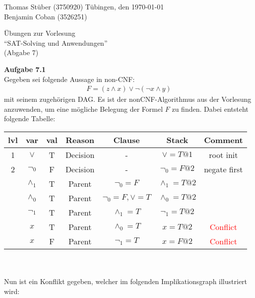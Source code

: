 \documentclass[a4paper,10pt]{article}
\title{}
\author{}
\begin{document}
\noindent Thomas Stüber (3750920) \hfill Tübingen, den  \today\\
\noindent Benjamin Coban (3526251) \\
\begin{center}
\Large Übungen zur Vorlesung  \\ ``SAT-Solving und Anwendungen'' \\
\vspace*{2mm}
\large (Abgabe 7) \\
\vspace*{2mm}
\end{center}

\noindent\textbf{Aufgabe 7.1}\\

Gegeben sei folgende Aussage in non-CNF:
\begin{align*}
F = (z \wedge x) \vee \neg(\neg x \wedge y)
\end{align*}
mit seinem zugehörigen DAG. Es ist der nonCNF-Algorithmus aus der Vorlesung anzuwenden, um eine mögliche Belegung der Formel $F$ zu finden. Dabei entsteht folgende Tabelle:\\
\begin{tabular}{|c|c|c|c|c|c|c|}
	\hline 
	lvl & var & val & Reason & Clause & Stack & Comment \\ 
	\hline 
	1 & $\vee$ & T & Decision & - & $\vee=T@1$ & root init \\ 
	\hline 
	2 & $\neg_0$ & F & Decision & - & $\neg_0=F@2$ & negate first \\ 
	\hline 
	& $\wedge_1$ & T & Parent & $\neg_0=F$ & $\wedge_1=T@2$ &  \\ 
	\hline 
	& $\wedge_0$ & T & Parent & $\neg_0=F,\vee = T$ & $\wedge_0=T@2$ &  \\ 
	\hline 
	& $\neg_1$ & T & Parent & $\wedge_1=T$ & $\neg_1=T@2$ &  \\ 
	\hline 
	& $x$ & T & Parent & $\wedge_0=T$ & $x=T@2$ & \textcolor{red}{Conflict} \\ 
	\hline 
	& $x$ & F & Parent & $\neg_1=T$ & $x=F@2$ & \textcolor{red}{Conflict} \\ 
	\hline 
\end{tabular}\\\\Nun ist ein Konflikt gegeben, welcher im folgenden Implikationsgraph illustriert wird:
\end{document}
